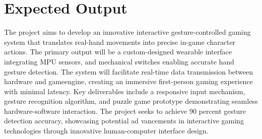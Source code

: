 \section{Expected Output}

 The project aims to develop an innovative interactive gesture-controlled gaming system that
 translates real-hand movements into precise in-game character actions. The primary output will
 be a custom-designed wearable interface integrating MPU sensors, and mechanical switches
 enabling accurate hand gesture detection. The system will facilitate real-time data transmission
 between hardware and gameengine, creating an immersive first-person gaming experience with
 minimal latency. Key deliverables include a responsive input mechanism, gesture recognition
 algorithm, and puzzle game prototype demonstrating seamless hardware-software interaction.
 The project seeks to achieve 90 percent gesture detection accuracy, showcasing potential ad
vancements in interactive gaming technologies through innovative human-computer interface
 design.
 